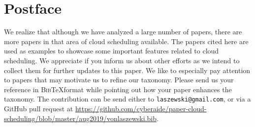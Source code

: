 \documentclass[final,5p,times,twocolumn]{elsarticle}
\begin{document}
\section*{Postface}

We realize that although we have analyzed a large number of papers,
there are more papers in that area of cloud scheduling available. The
papers cited here are used as examples to showcase some important
features related to cloud scheduling.  We appreciate if you inform us
about other efforts as we intend to collect them for further updates
to this paper. We like to especially pay attention to papers that may
motivate us to refine our taxonomy. Please send us your reference in
\textsc{Bib}\TeX format while pointing out how your paper enhances the
taxonomy. The contribution can be send either to
\verb|laszewski@gmail.com|, or via a GitHub pull request at
\url{https://github.com/cyberaide/paper-cloud-scheduling/blob/master/aug2019/vonlaszewski.bib}.


%





\end{document}

